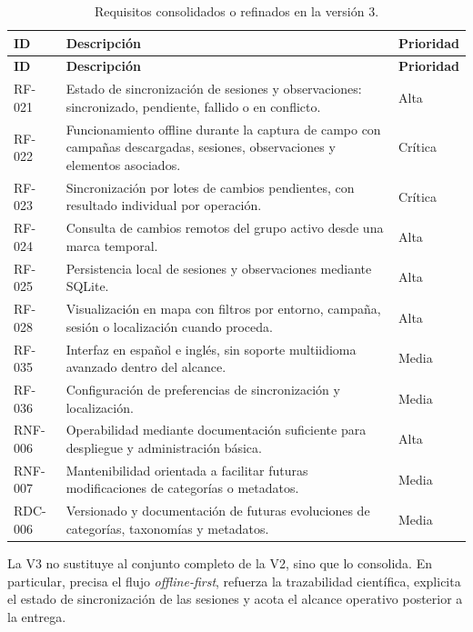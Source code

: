 {\small
\setlength{\tabcolsep}{4pt}
\renewcommand{\arraystretch}{1.08}
\begin{longtable}{>{\raggedright\arraybackslash}p{1.8cm} >{\raggedright\arraybackslash}p{10.1cm} >{\raggedright\arraybackslash}p{2.1cm}}
  \caption{Requisitos consolidados o refinados en la versión 3.}
  \label{tab:requisitos_v3} \\
  \toprule
  \textbf{ID} & \textbf{Descripción} & \textbf{Prioridad} \\
  \midrule
  \endfirsthead
  \toprule
  \textbf{ID} & \textbf{Descripción} & \textbf{Prioridad} \\
  \midrule
  \endhead
  RF-021 & Estado de sincronización de sesiones y observaciones: sincronizado, pendiente, fallido o en conflicto. & Alta \\
  RF-022 & Funcionamiento offline durante la captura de campo con campañas descargadas, sesiones, observaciones y elementos asociados. & Crítica \\
  RF-023 & Sincronización por lotes de cambios pendientes, con resultado individual por operación. & Crítica \\
  RF-024 & Consulta de cambios remotos del grupo activo desde una marca temporal. & Alta \\
  RF-025 & Persistencia local de sesiones y observaciones mediante SQLite. & Alta \\
  RF-028 & Visualización en mapa con filtros por entorno, campaña, sesión o localización cuando proceda. & Alta \\
  RF-035 & Interfaz en español e inglés, sin soporte multiidioma avanzado dentro del alcance. & Media \\
  RF-036 & Configuración de preferencias de sincronización y localización. & Media \\
  RNF-006 & Operabilidad mediante documentación suficiente para despliegue y administración básica. & Alta \\
  RNF-007 & Mantenibilidad orientada a facilitar futuras modificaciones de categorías o metadatos. & Media \\
  RDC-006 & Versionado y documentación de futuras evoluciones de categorías, taxonomías y metadatos. & Media \\
  \bottomrule
\end{longtable}
}

La V3 no sustituye al conjunto completo de la V2, sino que lo consolida. En
particular, precisa el flujo \textit{offline-first}, refuerza la trazabilidad
científica, explicita el estado de sincronización de las sesiones y acota el
alcance operativo posterior a la entrega.

